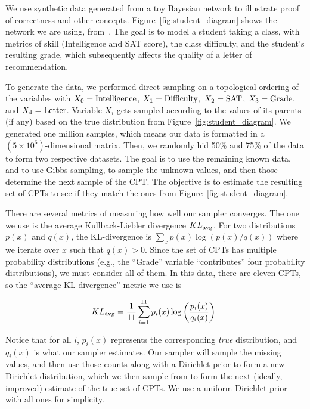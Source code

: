 \documentclass{article} %
\begin{document}
We use synthetic data generated from a toy Bayesian network to illustrate proof of correctness and
other concepts. Figure~\ref{fig:student_diagram} shows the network we are using,
from~\citet{Koller2009}. The goal is to model a student taking a class, with metrics of skill
(Intelligence and SAT score), the class difficulty, and the student's resulting grade, which
subsequently affects the quality of a letter of recommendation.

To generate the data, we performed direct sampling on a topological ordering of the variables with
$X_0 = {\rm Intelligence}$, $X_1 = {\rm Difficulty},$ $X_2 = {\rm SAT}$, $X_3 = {\rm Grade}$, and
$X_4 = {\rm Letter}$. Variable $X_i$ gets sampled according to the values of its parents (if any)
based on the true distribution from Figure~\ref{fig:student_diagram}. We generated one million
samples, which means our data is formatted in a $(5\times 10^6)$-dimensional matrix. Then, we
randomly hid 50\% and 75\% of the data to form two respective datasets. The goal is to use the
remaining known data, and to use Gibbs sampling, to sample the unknown values, and then those
determine the next sample of the CPT. The objective is to estimate the resulting set of CPTs to see
if they match the ones from Figure~\ref{fig:student_diagram}.

There are several metrics of measuring how well our sampler converges. The one we use is the average
Kullback-Liebler divergence $KL_{\rm avg}$. For two distributions $p(x)$ and $q(x)$, the
KL-divergence is $\sum_x p(x) \log(p(x)/q(x))$ where we iterate over $x$ such that $q(x) > 0$. Since
the set of CPTs has multiple probability distributions (e.g., the ``Grade'' variable ``contributes''
four probability distributions), we must consider all of them. In this data, there are eleven CPTs,
so the ``average KL divergence'' metric we use is

\begin{equation}\label{eq:avg_kl}
KL_{\rm avg} = \frac{1}{11}\sum_{i=1}^{11} p_i(x) \log\left(\frac{p_i(x)}{q_i(x)}\right).
\end{equation}

Notice that for all $i$, $p_i(x)$ represents the corresponding \emph{true} distribution, and
$q_i(x)$ is what our sampler estimates. Our sampler will sample the missing values, and then use
those counts along with a Dirichlet prior to form a new Dirichlet distribution, which we then sample
from to form the next (ideally, improved) estimate of the true set of CPTs. We use a uniform
Dirichlet prior with all ones for simplicity.
\end{document}
